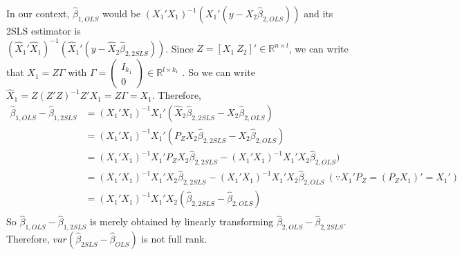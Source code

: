 \documentclass[12pt]{article}
\theoremstyle{definition}
\theoremstyle{property}
\theoremstyle{assumption}
\theoremstyle{example}
\theoremstyle{comment}
\begin{document}
In our context, $\hat{\beta}_{1,OLS}$ would be $(X_1'X_1)^{-1}(X_1'(y-X_2\hat{\beta}_{2,OLS}))$ and its 2SLS estimator is \\ $(\widehat{X}_1'\widehat{X}_1)^{-1}(\widehat{X}_1'(y-\widehat{X}_2\hat{\beta}_{2,2SLS}))$. Since $Z=[X_1 \ Z_2]'\in\mathbb{R}^{n\times l }$, we can write that $X_1=Z\Gamma$ with $\Gamma=\begin{pmatrix}I_{k_1}\\ 0\end{pmatrix}\in\mathbb{R}^{l \times k_1}$ . So we can write $\widehat{X}_1 = Z(Z'Z)^{-1}Z'X_1=Z\Gamma=X_1$. Therefore, 
\[
\begin{aligned}
\hat{\beta}_{1,OLS}-\hat{\beta}_{1,2SLS}& =(X_1'X_1)^{-1}X_1'(\widehat{X}_2\hat{\beta}_{2,2SLS}-X_2\hat{\beta}_{2,OLS})\\
&=(X_1'X_1)^{-1}X_1'(P_ZX_2\hat{\beta}_{2,2SLS}-X_2\hat{\beta}_{2,OLS})\\
&=(X_1'X_1)^{-1}X_1'P_ZX_2\hat{\beta}_{2,2SLS}-(X_1'X_1)^{-1}X_1'X_2\hat{\beta}_{2,OLS})\\
&=(X_1'X_1)^{-1}X_1'X_2\hat{\beta}_{2,2SLS}-(X_1'X_1)^{-1}X_1'X_2\hat{\beta}_{2,OLS} \ (\because X_1'P_Z=(P_ZX_1)'=X_1')\\
&=(X_1'X_1)^{-1}X_1'X_2(\hat{\beta}_{2,2SLS}-\hat{\beta}_{2,OLS})\\
\end{aligned}
\]
So $\hat{\beta}_{1,OLS}-\hat{\beta}_{1,2SLS}$ is merely obtained by linearly transforming $\hat{\beta}_{2,OLS}-\hat{\beta}_{2,2SLS}$. Therefore, $var(\hat{\beta}_{2SLS}-\hat{\beta}_{OLS})$ is not full rank. 
\end{document}
